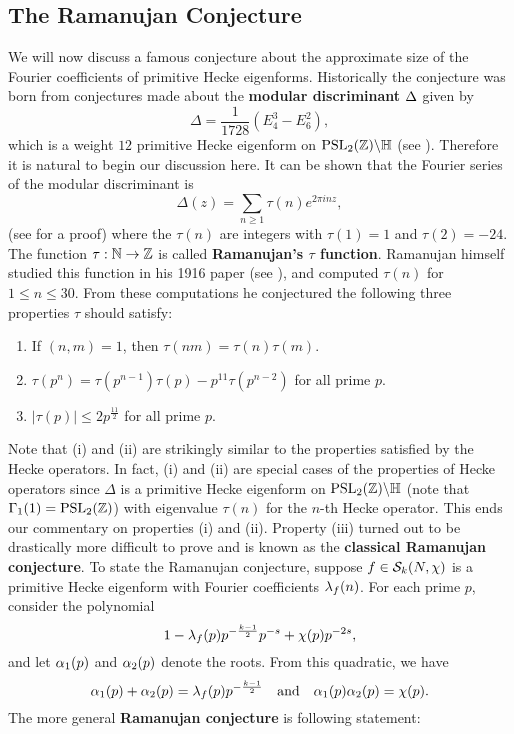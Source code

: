     \subsection*{The Ramanujan Conjecture}
      We will now discuss a famous conjecture about the approximate size of the Fourier coefficients of primitive Hecke eigenforms. Historically the conjecture was born from conjectures made about the \textbf{modular discriminant} $\Delta$ given by
      \[
        \Delta = \frac{1}{1728}(E_{4}^{3}-E_{6}^{2}),
      \]
      which is a weight $12$ primitive Hecke eigenform on $\mathrm{PSL}_{2}(\mathbb{Z})\backslash\mathbb{H}$ (see \cite{diamond2005first}). Therefore it is natural to begin our discussion here. It can be shown that the Fourier series of the modular discriminant is
      \[
        \Delta(z) = \sum_{n \ge 1}\tau(n)e^{2\pi i nz},
      \]
      (see \cite{apostol1976introduction} for a proof) where the $\tau(n)$ are integers with $\tau(1) = 1$ and $\tau(2) = -24$. The function $\tau:\mathbb{N} \to \mathbb{Z}$ is called \textbf{Ramanujan's $\tau$ function}. Ramanujan himself studied this function in his 1916 paper (see \cite{ramanujan1916certain}), and computed $\tau(n)$ for $1 \le n \le 30$. From these computations he conjectured the following three properties $\tau$ should satisfy:
      \begin{enumerate}[label=(\roman*)]
        \item If $(n,m) = 1$, then $\tau(nm) = \tau(n)\tau(m)$.
        \item $\tau(p^{n}) = \tau(p^{n-1})\tau(p)-p^{11}\tau(p^{n-2})$ for all prime $p$.
        \item $|\tau(p)| \le 2p^{\frac{11}{2}}$ for all prime $p$.
      \end{enumerate}
      Note that (i) and (ii) are strikingly similar to the properties satisfied by the Hecke operators. In fact, (i) and (ii) are special cases of the properties of Hecke operators since $\Delta$ is a primitive Hecke eigenform on $\mathrm{PSL}_{2}(\mathbb{Z})\backslash\mathbb{H}$ (note that $\Gamma_{1}(1) = \mathrm{PSL}_{2}(\mathbb{Z})$) with eigenvalue $\tau(n)$ for the $n$-th Hecke operator. This ends our commentary on properties (i) and (ii). Property (iii) turned out to be drastically more difficult to prove and is known as the \textbf{classical Ramanujan conjecture}. To state the Ramanujan conjecture, suppose $f \in \mathcal{S}_{k}(N,\chi)$ is a primitive Hecke eigenform with Fourier coefficients $\lambda_{f}(n)$. For each prime $p$, consider the polynomial
      \[
        1-\lambda_{f}(p)p^{-\frac{k-1}{2}}p^{-s}+\chi(p)p^{-2s},
      \]
      and let $\alpha_{1}(p)$ and $\alpha_{2}(p)$ denote the roots. From this quadratic, we have
      \[
        \alpha_{1}(p)+\alpha_{2}(p) = \lambda_{f}(p)p^{-\frac{k-1}{2}} \quad \text{and} \quad \alpha_{1}(p)\alpha_{2}(p) = \chi(p).
      \]
      The more general \textbf{Ramanujan conjecture} is following statement:

